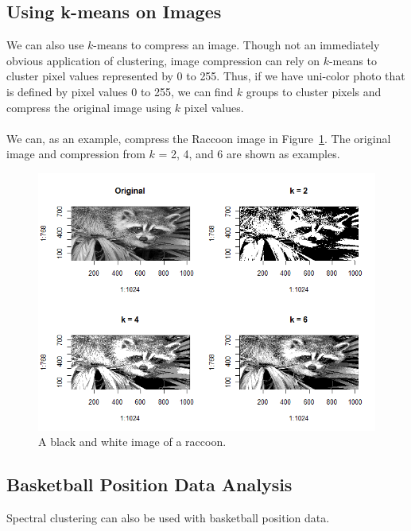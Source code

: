 \documentclass[12pt]{article}
\theoremstyle{plain}
\begin{document}
\subsection{Using k-means on Images}
We can also use $ k $-means to compress an image. Though not an immediately obvious application of clustering, image compression can rely on $ k $-means to cluster pixel values represented by 0 to 255. Thus, if we have uni-color photo that is defined by pixel values 0 to 255, we can find $ k $ groups to cluster pixels and compress the original image using $ k $ pixel values.
\\ \\
We can, as an example, compress the Raccoon image in Figure~\ref{fig:raccoon}. The original image and compression from $ k $ = 2, 4, and 6 are shown as examples.
\begin{figure}[H]
  \captionsetup{width=0.8\textwidth}
  \centering
  \includegraphics[width=\textwidth]{raccoon}
  \caption{
      A black and white image of a raccoon.
  }
  \label{fig:raccoon}
\end{figure}



\subsection{Basketball Position Data Analysis}

Spectral clustering can also be used with basketball position data.


{}

\end{document}
